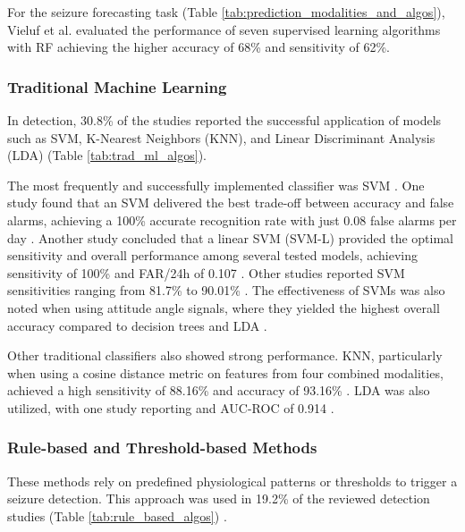 For the seizure forecasting task (Table \ref{tab:prediction_modalities_and_algos}), Vieluf et al. \cite{Vieluf2023-zv} evaluated the performance of seven supervised learning algorithms with RF achieving the higher accuracy of 68\% and sensitivity of 62\%.


\subsubsection{Traditional Machine Learning}
In detection, 30.8\% of the studies reported the successful application of models such as SVM, K-Nearest Neighbors (KNN), and Linear Discriminant Analysis (LDA) (Table \ref{tab:trad_ml_algos})\cite{Milosevic2016-ee, Hamlin2021-sd, Poh2012-af, Ge2023-ab, Li2022-ty, Xu2022-tx, Wang2025-my, De_Cooman2018-pq}.

The most frequently and successfully implemented classifier was SVM \cite{Milosevic2016-ee, De_Cooman2018-pq, Poh2012-af, Ge2023-ab, Li2022-ty, Xu2022-tx, Wang2025-my}. One study found that an SVM delivered the best trade-off between accuracy and false alarms, achieving a 100\% accurate recognition rate with just 0.08 false alarms per day \cite{Xu2022-tx}. Another study concluded that a linear SVM (SVM-L) provided the optimal sensitivity and overall performance among several tested models, achieving sensitivity of 100\% and FAR/24h of 0.107 \cite{Wang2025-my}. Other studies reported SVM sensitivities ranging from 81.7\% \cite{Li2022-ty} to 90.01\% \cite{Milosevic2016-ee}. The effectiveness of SVMs was also noted when using attitude angle signals, where they yielded the highest overall accuracy compared to decision trees and LDA \cite{Wang2025-ql}.

Other traditional classifiers also showed strong performance. KNN, particularly when using a cosine distance metric on features from four combined modalities, achieved a high sensitivity of 88.16\% and accuracy of 93.16\% \cite{Ge2023-ab}. LDA was also utilized, with one study reporting and AUC-ROC of 0.914 \cite{Hamlin2021-sd}.


\subsubsection{Rule-based and Threshold-based Methods}
These methods rely on predefined physiological patterns or thresholds to trigger a seizure detection. This approach was used in 19.2\% of the reviewed detection studies (Table \ref{tab:rule_based_algos}) \cite{Cogan2017-lg, Ali2020-ke, Hegarty-Craver2021-hk, Gheryani2017-yg, Arends2018-ew}.

